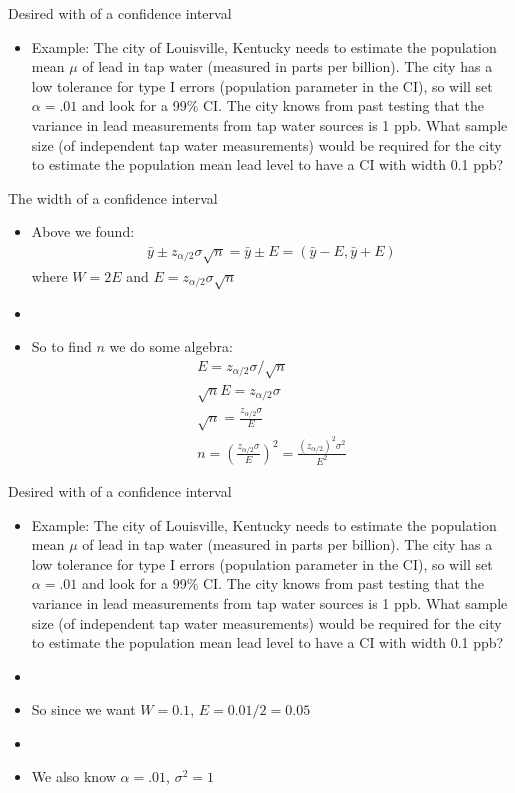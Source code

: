\documentclass[xcolor=dvipsnames]{beamer}
\begin{document}
\begin{frame}{Desired with of a confidence interval}
	\begin{itemize}
		\item Example: The city of Louisville, Kentucky needs to estimate the population mean $\mu$ of lead in tap water (measured in parts per billion). The city has a low tolerance for type I errors (population parameter in the CI), so will set $\alpha = .01$ and look for a 99\% CI. The city knows from past testing that the variance in lead measurements from tap water sources is 1 ppb. What sample size (of independent tap water measurements) would be required for the city to estimate the population mean lead level to have a CI with width 0.1 ppb?
	\end{itemize}
\end{frame}

\begin{frame}{The width of a confidence interval}
\begin{itemize}
	\item Above we found:
	\begin{align*}
	\bar{y}\pm z_{\alpha/2} \sigma \sqrt{n} = \bar{y} \pm E = (\bar{y}-E, \bar{y}+E)
	\end{align*}
	where $W = 2E$ and $E = z_{\alpha/2} \sigma \sqrt{n}$
	\item[]
	\item So to find $n$ we do some algebra:
	\begin{gather*}
		E = z_{\alpha/2} \sigma / \sqrt{n} \\
		\sqrt{n} E = z_{\alpha/2} \sigma  \\
		\sqrt{n} = \frac{z_{\alpha/2} \sigma}{E} \\
		n = \left(\frac{z_{\alpha/2} \sigma}{E}\right)^2 = \frac{(z_{\alpha/2})^2 \sigma^2}{E^2}
	\end{gather*}
\end{itemize}
\end{frame}

\begin{frame}{Desired with of a confidence interval}
		\begin{itemize}
		\item Example: The city of Louisville, Kentucky needs to estimate the population mean $\mu$ of lead in tap water (measured in parts per billion). The city has a low tolerance for type I errors (population parameter in the CI), so will set $\alpha = .01$ and look for a 99\% CI. The city knows from past testing that the variance in lead measurements from tap water sources is 1 ppb. What sample size (of independent tap water measurements) would be required for the city to estimate the population mean lead level to have a CI with width 0.1 ppb?
		\item[]
		\item So since we want $W = 0.1$, $E = 0.01/2 = 0.05$
		\item[]
		\item We also know $\alpha = .01$, $\sigma^2 = 1$
	\end{itemize}
\end{frame}
\end{document}
